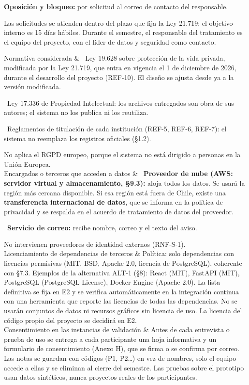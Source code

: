 \documentclass[10pt,a4paper]{article}
\newenvironment{kv}[1][4.6cm]
  {\footnotesize\setlength{\extrarowheight}{3pt}\xltabular{\linewidth}{|E{#1}|L|}\hline}
  {\endxltabular}
\newcommand{\kvrow}[2]{#1 & #2 \\ \hline}
\begin{document}
\begin{kv}
{\textbf{Oposición y bloqueo:} por solicitud al correo de contacto del responsable.\par
Las solicitudes se atienden dentro del plazo que fija la Ley 21.719; el objetivo interno es 15 días hábiles. Durante el semestre, el responsable del tratamiento es el equipo del proyecto, con el líder de datos y seguridad como contacto.}
\kvrow{Normativa considerada}{%
\textbullet~Ley 19.628 sobre protección de la vida privada, modificada por la Ley 21.719, que entra en vigencia el 1 de diciembre de 2026, durante el desarrollo del proyecto (REF-10). El diseño se ajusta desde ya a la versión modificada.\par
\textbullet~Ley 17.336 de Propiedad Intelectual: los archivos entregados son obra de sus autores; el sistema no los publica ni los reutiliza.\par
\textbullet~Reglamentos de titulación de cada institución (REF-5, REF-6, REF-7): el sistema no reemplaza los registros oficiales (§1.2).\par
No aplica el RGPD europeo, porque el sistema no está dirigido a personas en la Unión Europea.}
\kvrow{Encargados o terceros que acceden a datos}{%
\textbullet~\textbf{Proveedor de nube (AWS: servidor virtual y almacenamiento, §9.3):} aloja todos los datos. Se usará la región más cercana disponible. Si esa región está fuera de Chile, existe una \textbf{transferencia internacional de datos}, que se informa en la política de privacidad y se respalda en el acuerdo de tratamiento de datos del proveedor.\par
\textbullet~\textbf{Servicio de correo:} recibe nombre, correo y el texto del aviso.\par
No intervienen proveedores de identidad externos (RNF-S-1).}
\kvrow{Licenciamiento de dependencias de terceros}{Política: solo dependencias con licencias permisivas (MIT, BSD, Apache 2.0, licencia de PostgreSQL), coherente con §7.3. Ejemplos de la alternativa ALT-1 (§8): React (MIT), FastAPI (MIT), PostgreSQL (PostgreSQL License), Docker Engine (Apache 2.0). La lista definitiva se fija en E2 y se verifica automáticamente en la integración continua con una herramienta que reporte las licencias de todas las dependencias. No se usarán conjuntos de datos ni recursos gráficos sin licencia de uso. La licencia del código propio del proyecto se decidirá en E2.}
\kvrow{Consentimiento en las instancias de validación}{Antes de cada entrevista o prueba de uso se entrega a cada participante una hoja informativa y un formulario de consentimiento (Anexo H), que se firma o se confirma por correo. Las notas se guardan con códigos (P1, P2…) en vez de nombres, solo el equipo accede a ellas y se eliminan al cierre del semestre. Las pruebas sobre el prototipo usan datos sintéticos, nunca proyectos reales de los participantes.}
\end{kv}
\end{document}
